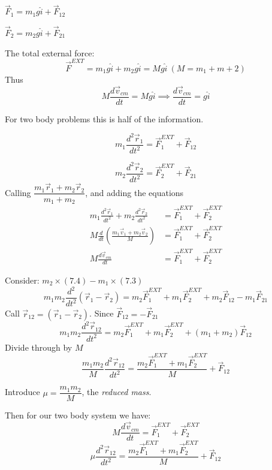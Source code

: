 \documentclass[10pt]{scrartcl}
\begin{document}
$\vec{F}_1 = m_1g \hat{i} + \vec{F}_{12}$

$\vec{F}_2 = m_2g \hat{i} + \vec{F}_{21}$

The total external force:
\[\vec{F}^{EXT} = m_1g\hat{i} + m_2g\hat{i} = Mg\hat{i} ~(M = m_1 + m+2)\]
Thus
\[M\frac{d\vec{v}_{cm}}{dt} = Mg\hat{i} \implies \frac{d\vec{v}_{cm}}{dt} = g\hat{i}\]

For two body problems this is half of the information.

\begin{equation}
m_1\frac{d^2\vec{r}_1}{dt^2} = \vec{F}_1^{EXT} + \vec{F}_{12}	
\end{equation}

\begin{equation}
m_2\frac{d^2\vec{r}_2}{dt^2} = \vec{F}_2^{EXT} + \vec{F}_{21}	
\end{equation}
Calling $\dfrac{m_1\vec{r}_1 + m_2\vec{r}_2}{m_1 + m_2}$, and adding the equations
\setlength{\jot}{10pt}
\[\begin{aligned}m_1\frac{d^2\vec{r}_1}{dt^2} + m_2\frac{d^2\vec{r}_2}{dt^2} &= \vec{F}_1^{EXT} + \vec{F}_{2}^{EXT}\\
M \frac{d}{dt}\left(\frac{m_1\vec{v}_1 + m_2\vec{v}_2}{M}\right) &=  \vec{F}_1^{EXT} + \vec{F}_{2}^{EXT}\\
M\frac{d\vec{v}_{cm}}{dt} &=  \vec{F}_1^{EXT} + \vec{F}_{2}^{EXT}
\end{aligned}\]

Consider: $m_2 \times (7.4) - m_1\times(7.3)$
\[m_1m_2\frac{d^2}{dt^2}(\vec{r}_1-\vec{r}_2) = m_2\vec{F}_1^{EXT} + m_1\vec{F}_2^{EXT} + m_2\vec{F}_{12} - m_1\vec{F}_{21}\]
Call $\vec{r}_{12} = (\vec{r}_1 - \vec{r}_2)$. Since $\vec{F}_{12} = -\vec{F}_{21}$
\[m_1m_2\frac{d^2\vec{r}_{12}}{dt^2} = m_2\vec{F}_1^{EXT} + m_1\vec{F}_2^{EXT} + (m_1 + m_2)\vec{F}_{12}\]
Divide through by $M$
\[\frac{m_1m_2}{M}\frac{d^2\vec{r}_{12}}{dt^2} = \frac{m_2\vec{F}_1^{EXT} + m_1\vec{F}_2^{EXT}}{M} + \vec{F}_{12}\]
\begin{definition} Introduce $\mu = \dfrac{m_1m_2}{M}$, the \emph{reduced mass}.
\end{definition}
Then for our two body system we have:
\begin{equation}
M\frac{d\vec{v}_{cm}}{dt} =  \vec{F}_1^{EXT} + \vec{F}_{2}^{EXT}
\end{equation}
\begin{equation}
\mu\frac{d^2\vec{r}_{12}}{dt^2} = \frac{m_2\vec{F}_1^{EXT} + m_1\vec{F}_2^{EXT}}{M} + \vec{F}_{12}
\end{equation}~
\end{document}
